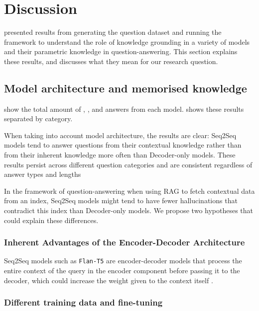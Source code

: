\section{Discussion}
\label{discussion}

 presented results from generating the question dataset and running the framework to understand the role of knowledge grounding in a variety of models and their parametric knowledge in question-answering.
This section explains these results, and discusses what they mean for our research question.

\subsection{Model architecture and memorised knowledge}
\label{model_architecture_parametric}

 show the total amount of \Parametric{}, \Contextual{}, and \Other{} answers from each model.
 shows these results separated by category.

When taking into account model architecture, the results are clear: Seq2Seq models tend to answer questions from their contextual knowledge rather than from their inherent knowledge more often than Decoder-only models.
These results persist across different question categories and are consistent regardless of answer types and lengths

In the framework of question-answering when using RAG to fetch contextual data from an index, Seq2Seq models might tend to have fewer hallucinations that contradict this index than Decoder-only models.
We propose two hypotheses that could explain these differences.

\subsubsection{Inherent Advantages of the Encoder-Decoder Architecture}

Seq2Seq models such as \texttt{Flan-T5} are encoder-decoder models that process the entire context of the query in the encoder component before passing it to the decoder, which could increase the weight given to the context itself \cite{flant5}.

\subsubsection{Different training data and fine-tuning}

